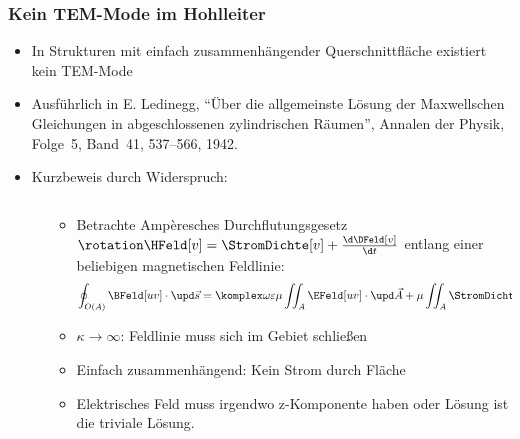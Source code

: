 \begin{frame}
  \frametitle{Kein TEM-Mode im Hohlleiter}
  \begin{itemize}[<+->]
  \item In Strukturen mit \alert{einfach zusammenhängender Querschnittfläche} existiert kein TEM-Mode
    \item Ausführlich in E. Ledinegg, \enquote{Über die allgemeinste Lösung der Maxwellschen Gleichungen in abgeschlossenen zylindrischen Räumen}, Annalen der Physik, Folge~5, Band~41, 537--566, 1942.
\item Kurzbeweis durch Widerspruch:
  \begin{columns}
    \begin{column}{.35\textwidth}
          \end{column}
    \begin{column}{.65\textwidth}
  \begin{itemize}[<+->]
  \item Betrachte Ampèresches Durchflutungsgesetz \(\rotation\HFeld[v]=\StromDichte[v]+\frac{\d \DFeld[v]}{\d t}\) entlang einer beliebigen magnetischen Feldlinie:
    \begin{equation*}
      \oint_{O(A)} \BFeld[uv] \cdot \upd\vec{s} = \komplex\omega\varepsilon\mu \iint_{A} \EFeld[uv]\cdot\upd\vec{A} + \mu\iint_{A} \StromDichte[uv]\cdot\upd\vec{A}
    \end{equation*}
  \item \(\kappa\to\infty\): Feldlinie muss sich im Gebiet schließen
  \item Einfach zusammenhängend: Kein Strom durch Fläche
    \item Elektrisches Feld muss irgendwo z-Komponente haben oder Lösung ist die triviale Lösung.
  \end{itemize}
          \end{column}
\end{columns}    
\end{itemize}
\ 
\end{frame}

